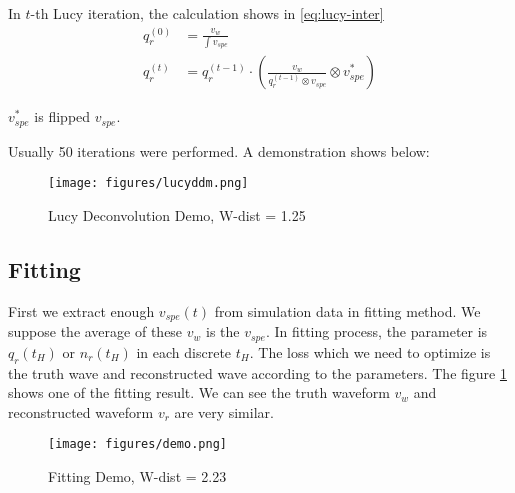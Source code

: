 In $t$-th Lucy iteration, the calculation shows in \eqref{eq:lucy-inter}
\begin{align}
    q_{r}^{(0)} &= \frac{v_{w}}{\int v_{spe}} \\
    q_{r}^{(t)} &= q_{r}^{(t-1)} \cdot \left(\frac{v_{w}}{q_{r}^{(t-1)} \otimes v_{spe}} \otimes v^{*}_{spe}\right)
    \label{eq:lucy-inter}
\end{align}

$v^{*}_{spe}$ is flipped $v_{spe}$. 

Usually 50 iterations were performed. A demonstration shows below: 

\begin{figure}[H]
    \centering
    \texttt{[image: figures/lucyddm.png]}
    \caption{Lucy Deconvolution Demo, W-dist = 1.25}
\end{figure}

\subsection{Fitting}
First we extract enough $v_{spe}(t)$ from simulation data in fitting method. We suppose the average of these $v_{w}$ is the $v_{spe}$. In fitting process, the parameter is $q_{r}(t_{H})$ or $n_{r}(t_{H})$ in each discrete $t_{H}$. The loss which we need to optimize is the truth wave and reconstructed wave according to the parameters. The figure \ref{fig:fitting} shows one of the fitting result. We can see the truth waveform $v_{w}$ and reconstructed waveform $v_{r}$ are very similar. 

\begin{figure}[H]
    \centering
    \texttt{[image: figures/demo.png]}
    \caption{\label{fig:fitting} Fitting Demo, W-dist = 2.23}
\end{figure}

